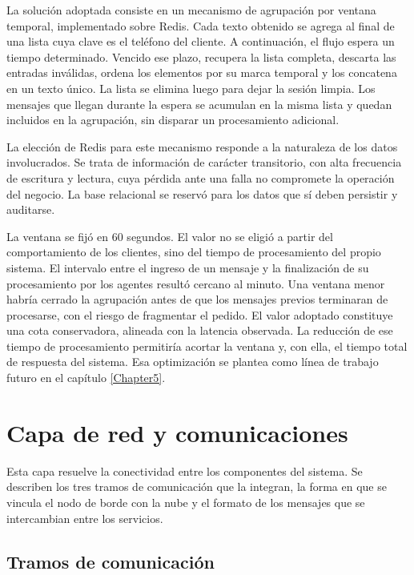 La solución adoptada consiste en un mecanismo de agrupación por ventana temporal, implementado sobre Redis. Cada texto obtenido se agrega al final de una lista cuya clave es el teléfono del cliente. A continuación, el flujo espera un tiempo determinado. Vencido ese plazo, recupera la lista completa, descarta las entradas inválidas, ordena los elementos por su marca temporal y los concatena en un texto único. La lista se elimina luego para dejar la sesión limpia. Los mensajes que llegan durante la espera se acumulan en la misma lista y quedan incluidos en la agrupación, sin disparar un procesamiento adicional.

La elección de Redis para este mecanismo responde a la naturaleza de los datos involucrados. Se trata de información de carácter transitorio, con alta frecuencia de escritura y lectura, cuya pérdida ante una falla no compromete la operación del negocio. La base relacional se reservó para los datos que sí deben persistir y auditarse.

La ventana se fijó en 60 segundos. El valor no se eligió a partir del comportamiento de los clientes, sino del tiempo de procesamiento del propio sistema. El intervalo entre el ingreso de un mensaje y la finalización de su procesamiento por los agentes resultó cercano al minuto. Una ventana menor habría cerrado la agrupación antes de que los mensajes previos terminaran de procesarse, con el riesgo de fragmentar el pedido. El valor adoptado constituye una cota conservadora, alineada con la latencia observada. La reducción de ese tiempo de procesamiento permitiría acortar la ventana y, con ella, el tiempo total de respuesta del sistema. Esa optimización se plantea como línea de trabajo futuro en el capítulo \ref{Chapter5}.


\section{Capa de red y comunicaciones}
\label{sec:capa_red}

Esta capa resuelve la conectividad entre los componentes del sistema. Se describen los tres tramos de comunicación que la integran, la forma en que se vincula el nodo de borde con la nube y el formato de los mensajes que se intercambian entre los servicios.

\subsection{Tramos de comunicación}
\label{subsec:tramos}

